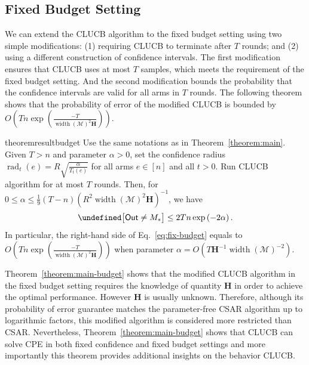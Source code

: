 \documentclass{article}
\newcommand{\Algorithm}{{\small \textsf{CLUCB}}\xspace}
\newcommand{\AlgorithmBud}{{\small \textsf{CSAR}}\xspace}
\newcommand{\Problem}{{CPE}\xspace}
\newcommand{\Rew}{\varphi}
\newcommand{\M}{\mathcal M}
\newcommand{\B}{\mathcal B}
\newcommand{\RR}{\mathbb R}
\DeclareMathOperator{\rank}{width}
\DeclareMathOperator{\rad}{rad}
\newcommand{\out}{\mathsf{Out}}
\let\Pr\undefined
\DeclareMathOperator{\Pr}{Pr}
\newcommand{\MultiIdent}{\textsc{TopK}\xspace}
\renewcommand{\vec}[1]{\boldsymbol{#1}}
\begin{document}
\subsection{Fixed Budget Setting}
\label{section:fixed-budget}
We can extend the \Algorithm algorithm to the fixed budget setting using two simple modifications: (1) requiring \Algorithm to terminate after $T$ rounds; and (2) using a different construction of confidence intervals.
The first modification ensures that \Algorithm uses at most $T$ samples, which meets the requirement of the fixed budget setting.
And the second modification bounds the probability that the confidence intervals are valid for all arms in $T$ rounds.
The following theorem shows that the probability of error of the modified \Algorithm is bounded by 
$O\left(Tn\exp\left(\frac{-T}{\rank(\M)^2\mathbf H} \right)\right)$.
\begin{restatable}{theorem}{resultbudget}
Use the same notations as in Theorem~\ref{theorem:main}.
Given $T > n$ and parameter $\alpha > 0$, set the confidence radius $\rad_t(e) = R\sqrt{\frac{\alpha}{T_t(e)}}$ for all arms $e\in[n]$ and all $t>0$.
Run \Algorithm algorithm for at most $T$ rounds.
Then, for $0 \le \alpha \le \frac19 (T-n)\left(R^2\rank(\M)^2 \mathbf H\right)^{-1}$, we have
\begin{equation}
\label{eq:fix-budget}
\Pr\big[\out\not=M_*\big] \le 2Tn\exp\left(-2\alpha\right).
\end{equation}
In particular, the right-hand side of Eq.~\eqref{eq:fix-budget} equals to $O\left(Tn\exp\left(\frac{-T}{\rank(\M)^2\mathbf H} \right)\right)$
when parameter $\alpha = O(T\mathbf H^{-1}\rank(\M)^{-2})$.
\label{theorem:main-budget}
\end{restatable}

Theorem~\ref{theorem:main-budget} shows that the modified \Algorithm algorithm in the fixed budget setting requires the knowledge of  quantity $\mathbf H$ in order to achieve the optimal performance. 
However $\mathbf H$ is usually unknown.
Therefore, although its probability of error guarantee matches the parameter-free \AlgorithmBud algorithm up to logarithmic factors, this modified algorithm is considered more restricted than \AlgorithmBud. 
Nevertheless, Theorem~\ref{theorem:main-budget} shows that \Algorithm can solve \Problem in both fixed confidence and fixed budget settings  and more importantly this theorem provides additional insights on the behavior \Algorithm.
\end{document}
